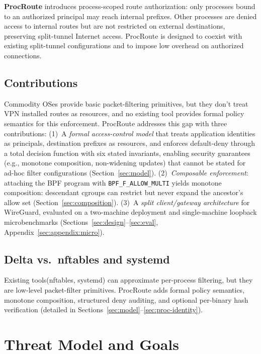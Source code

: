 \documentclass[sigconf]{acmart}
\begin{document}
\textbf{ProcRoute} introduces process-scoped route authorization:
only processes bound to an authorized principal may reach internal
prefixes.
Other processes are denied access to internal routes but are not
restricted on external destinations, preserving split-tunnel Internet
access.
ProcRoute is designed to coexist with existing split-tunnel
configurations and to impose low overhead on authorized connections.
\subsection{Contributions}
Commodity OSes provide basic packet-filtering primitives, but they
don't treat VPN installed routes as resources, and no existing
tool provides formal policy semantics for this enforcement.
ProcRoute addresses this gap with three contributions:
(1)~A \emph{formal access-control model} that treats application
identities as principals, destination prefixes as resources, and
enforces default-deny through a total decision function with six
stated invariants, enabling security guarantees
(e.g., monotone composition, non-widening updates) that cannot be
stated for ad-hoc filter configurations
(Section~\ref{sec:model}).
(2)~\emph{Composable enforcement}: attaching the BPF program with
\texttt{BPF\_F\_ALLOW\_MULTI} yields monotone composition: descendant
cgroups can restrict but never expand the ancestor's allow set
(Section~\ref{sec:composition}).
(3)~A \emph{split client/gateway architecture} for WireGuard,
evaluated on a two-machine deployment and single-machine
loopback microbenchmarks
(Sections~\ref{sec:design}--\ref{sec:eval},
Appendix~\ref{sec:appendix:micro}).
\subsection{Delta vs.\ nftables and systemd}
Existing tools(nftables, systemd) can approximate per-process filtering,
but they are low-level packet-filter primitives.
ProcRoute adds formal policy semantics, monotone composition,
structured deny auditing, and optional per-binary hash verification
(detailed in Sections~\ref{sec:model}--\ref{sec:proc-identity}).

\section{Threat Model and Goals}
\label{sec:threat}
\end{document}
